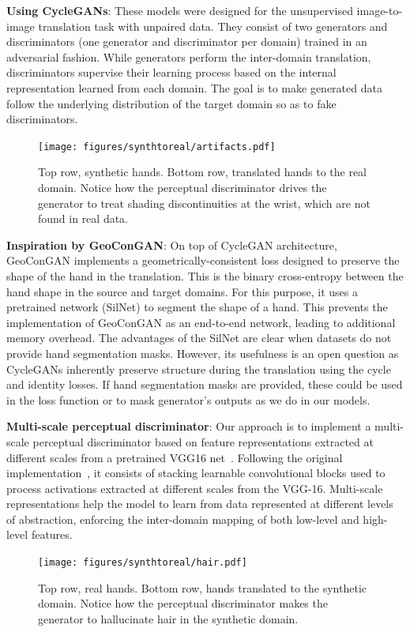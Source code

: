 \vspace*{0.1cm}\noindent\textbf{Using \acp{CycleGAN}}: These models were designed for the unsupervised image-to-image translation task with unpaired data. They consist of two generators and discriminators (one generator and discriminator per domain) trained in an adversarial fashion. While generators perform the inter-domain translation, discriminators supervise their learning process based on the internal representation learned from each domain. The goal is to make generated data follow the underlying distribution of the target domain so as to fake discriminators.
\begin{figure}[!htb]
	\centering
	\texttt{[image: figures/synthtoreal/artifacts.pdf]}
	\caption{Top row, synthetic hands. Bottom row, translated hands to the real domain. Notice how the perceptual discriminator drives the generator to treat shading discontinuities at the wrist, which are not found in real data.}
	\label{fig:artifacts}
\end{figure}

\vspace*{0.1cm}\noindent\textbf{Inspiration by \ac{GeoConGAN}}: On top of \ac{CycleGAN} architecture, \ac{GeoConGAN} implements a geometrically-consistent loss designed to preserve the shape of the hand in the translation. This is the binary cross-entropy between the hand shape in the source and target domains. For this purpose, it uses a pretrained network (SilNet) to segment the shape of a hand. This prevents the implementation of \ac{GeoConGAN} as an end-to-end network, leading to additional memory overhead. The advantages of the SilNet are clear when datasets do not provide hand segmentation masks. However, its usefulness is an open question as \acp{CycleGAN} inherently preserve structure during the translation using the cycle and identity losses. If hand segmentation masks are provided, these could be used in the loss function or to mask generator's outputs as we do in our models.

\vspace*{0.1cm}\noindent\textbf{Multi-scale perceptual discriminator}: Our approach is to implement a multi-scale perceptual discriminator based on feature representations extracted at different scales from a pretrained VGG16 net~\cite{Simonyan2015}. Following the original implementation~\cite{Sungatullina2018}, it consists of stacking learnable convolutional blocks used to process activations extracted at different scales from the VGG-16. Multi-scale representations help the model to learn from data represented at different levels of abstraction, enforcing the inter-domain mapping of both low-level and high-level features.
\begin{figure}[!htb]
	\centering
	\texttt{[image: figures/synthtoreal/hair.pdf]}
	\caption{Top row, real hands. Bottom row, hands translated to the synthetic domain. Notice how the perceptual discriminator makes the generator to hallucinate hair in the synthetic domain.}
	\label{fig:hair}
\end{figure}

